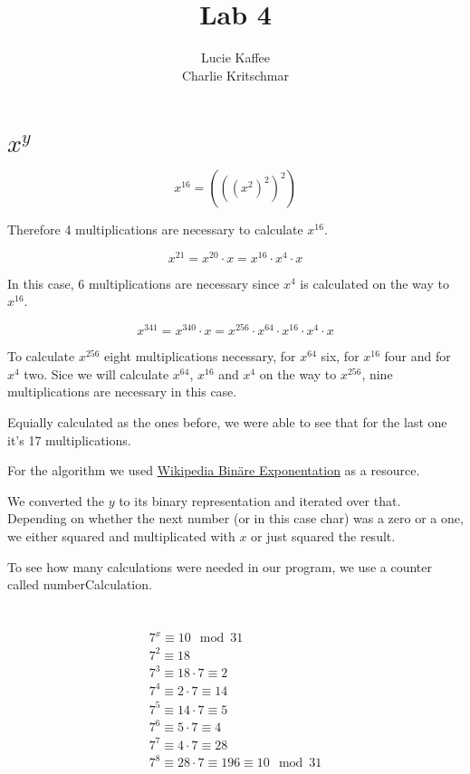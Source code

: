 \documentclass[11pt]{article}
\title{\textbf{Lab 4}}
\author{Lucie Kaffee\\
		Charlie Kritschmar
		}
\date{}
\begin{document}
\maketitle

\section{$x^{y}$}
\begin{equation}
x^{16} = (((x^ {2})^{2})^{2})
\end{equation}

Therefore 4 multiplications are necessary to calculate $x^{16}$.

\begin{equation}
x^{21} = x^ {20} \cdot x = x^{16} \cdot x^{4} \cdot x
\end{equation}

In this case, 6 multiplications are necessary since $x^{4}$ is calculated on the way to $x^{16}$. 

\begin{equation}
x^{341} = x^ {340} \cdot x = x^{256} \cdot x^{64} \cdot x^{16} \cdot x^{4} \cdot x
\end{equation}

To calculate $x^{256}$ eight multiplications necessary, for $x^{64}$ six, for $x^{16}$ four and for $x^{4}$ two. Sice we will calculate $x^{64}$, $x^{16}$ and $x^{4}$ on the way to $x^{256}$, nine multiplications are necessary in this case.

Equially calculated as the ones before, we were able to see that for the last one it's 17 multiplications.

For the algorithm we used \href{https://de.wikipedia.org/wiki/Bin%C3%A4re_Exponentiation#Pseudocode_.28Algorithmus.29}{Wikipedia Bin\"are Exponentation} as a resource.

We converted the $y$ to its binary representation and iterated over that. Depending on whether the next number (or in this case char) was a zero or a one, we either squared and multiplicated with $x$ or just squared the result.  

To see how many calculations were needed in our program, we use a counter called numberCalculation.

\section{}
\begin{equation}
\begin{split}
7^{x} \equiv 10 \mod 31 \\
7^2 \equiv 18 \\
7^3 \equiv 18 \cdot 7 \equiv 2 \\
7^4 \equiv 2 \cdot 7 \equiv 14 \\
7^5 \equiv 14 \cdot 7 \equiv 5 \\
7^6 \equiv 5 \cdot 7 \equiv 4 \\
7^7 \equiv 4 \cdot 7 \equiv 28 \\
7^8 \equiv 28 \cdot 7 \equiv 196 \equiv 10 \mod 31 \\
\end{split}
\end{equation}
\end{document}
